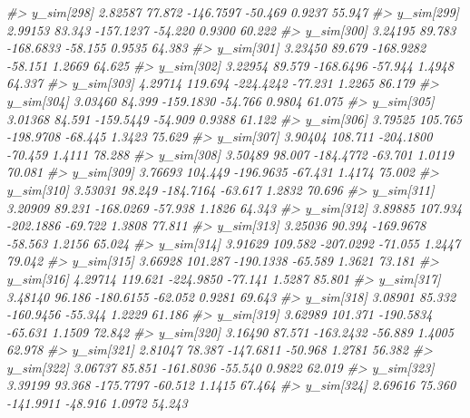 \documentclass[
  10pt,
  italian,
  a4paper,
  extrafontsizes,onecolumn,openright
  ]{memoir}
\newenvironment{Shaded}{\begin{snugshade}}{\end{snugshade}}
\newcommand{\CommentTok}[1]{\textcolor[rgb]{0.56,0.35,0.01}{\textit{#1}}}
\begin{document}
\begin{Shaded}
\begin{Highlighting}[]
\CommentTok{\#\textgreater{}   y\_sim[298]  2.82587  77.872 {-}146.7597 {-}50.469  0.9237  55.947}
\CommentTok{\#\textgreater{}   y\_sim[299]  2.99153  83.343 {-}157.1237 {-}54.220  0.9300  60.222}
\CommentTok{\#\textgreater{}   y\_sim[300]  3.24195  89.783 {-}168.6833 {-}58.155  0.9535  64.383}
\CommentTok{\#\textgreater{}   y\_sim[301]  3.23450  89.679 {-}168.9282 {-}58.151  1.2669  64.625}
\CommentTok{\#\textgreater{}   y\_sim[302]  3.22954  89.579 {-}168.6496 {-}57.944  1.4948  64.337}
\CommentTok{\#\textgreater{}   y\_sim[303]  4.29714 119.694 {-}224.4242 {-}77.231  1.2265  86.179}
\CommentTok{\#\textgreater{}   y\_sim[304]  3.03460  84.399 {-}159.1830 {-}54.766  0.9804  61.075}
\CommentTok{\#\textgreater{}   y\_sim[305]  3.01368  84.591 {-}159.5449 {-}54.909  0.9388  61.122}
\CommentTok{\#\textgreater{}   y\_sim[306]  3.79525 105.765 {-}198.9708 {-}68.445  1.3423  75.629}
\CommentTok{\#\textgreater{}   y\_sim[307]  3.90404 108.711 {-}204.1800 {-}70.459  1.4111  78.288}
\CommentTok{\#\textgreater{}   y\_sim[308]  3.50489  98.007 {-}184.4772 {-}63.701  1.0119  70.081}
\CommentTok{\#\textgreater{}   y\_sim[309]  3.76693 104.449 {-}196.9635 {-}67.431  1.4174  75.002}
\CommentTok{\#\textgreater{}   y\_sim[310]  3.53031  98.249 {-}184.7164 {-}63.617  1.2832  70.696}
\CommentTok{\#\textgreater{}   y\_sim[311]  3.20909  89.231 {-}168.0269 {-}57.938  1.1826  64.343}
\CommentTok{\#\textgreater{}   y\_sim[312]  3.89885 107.934 {-}202.1886 {-}69.722  1.3808  77.811}
\CommentTok{\#\textgreater{}   y\_sim[313]  3.25036  90.394 {-}169.9678 {-}58.563  1.2156  65.024}
\CommentTok{\#\textgreater{}   y\_sim[314]  3.91629 109.582 {-}207.0292 {-}71.055  1.2447  79.042}
\CommentTok{\#\textgreater{}   y\_sim[315]  3.66928 101.287 {-}190.1338 {-}65.589  1.3621  73.181}
\CommentTok{\#\textgreater{}   y\_sim[316]  4.29714 119.621 {-}224.9850 {-}77.141  1.5287  85.801}
\CommentTok{\#\textgreater{}   y\_sim[317]  3.48140  96.186 {-}180.6155 {-}62.052  0.9281  69.643}
\CommentTok{\#\textgreater{}   y\_sim[318]  3.08901  85.332 {-}160.9456 {-}55.344  1.2229  61.186}
\CommentTok{\#\textgreater{}   y\_sim[319]  3.62989 101.371 {-}190.5834 {-}65.631  1.1509  72.842}
\CommentTok{\#\textgreater{}   y\_sim[320]  3.16490  87.571 {-}163.2432 {-}56.889  1.4005  62.978}
\CommentTok{\#\textgreater{}   y\_sim[321]  2.81047  78.387 {-}147.6811 {-}50.968  1.2781  56.382}
\CommentTok{\#\textgreater{}   y\_sim[322]  3.06737  85.851 {-}161.8036 {-}55.540  0.9822  62.019}
\CommentTok{\#\textgreater{}   y\_sim[323]  3.39199  93.368 {-}175.7797 {-}60.512  1.1415  67.464}
\CommentTok{\#\textgreater{}   y\_sim[324]  2.69616  75.360 {-}141.9911 {-}48.916  1.0972  54.243}

\end{Highlighting}
\end{Shaded}
\end{document}
